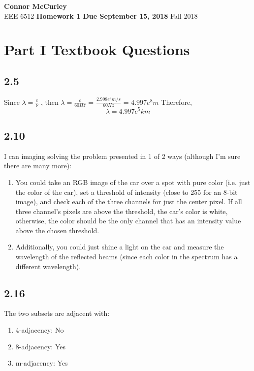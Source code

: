 \documentclass{article}[12 pt]
\begin{document}
	
\begin{center}
	\textbf{\Large Connor McCurley} \\
	EEE 6512 \qquad \textbf{\large Homework 1 Due September 15, 2018} \qquad Fall 2018 
\end{center}

\section*{Part I Textbook Questions}

\subsection*{2.5}

Since $\lambda = \frac{c}{\nu}$ , then  $\lambda = \frac{c}{60Hz}$ = $\frac{2.998e^8 m/s}{60Hz}$ = $4.997e^8m$ Therefore, \[ \boxed{\lambda = 4.997e^5 km} \]

\subsection*{2.10}
I can imaging solving the problem presented in 1 of 2 ways (although I'm sure there are many more):
\begin{enumerate}
\item You could take an RGB image of the car over a spot with pure color (i.e. just the color of the car), set a threshold of intensity (close to 255 for an 8-bit image), and check each of the three channels for just the center pixel.  If all three channel's pixels are above the threshold, the car's color is white, otherwise, the color should be the only channel that has an intensity value above the chosen threshold.

\item Additionally, you could just shine a light on the car and measure the wavelength of the reflected beams (since each color in the spectrum has a different wavelength).

\end{enumerate}


\subsection*{2.16}

The two subsets are adjacent with:
\begin{enumerate}
\item 4-adjacency: No 
\item 8-adjacency: Yes
\item m-adjacency: Yes
\end{enumerate}
\end{document}
